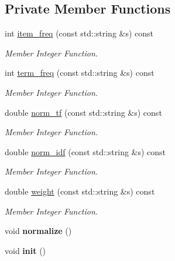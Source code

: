 \subsection*{Private Member Functions}
\begin{DoxyCompactItemize}
\item 
int \hyperlink{class_sentence_af3e48fa5d5776ae122b408191d67d327}{item\+\_\+freq} (const std\+::string \&s) const
\begin{DoxyCompactList}\small\item\em Member Integer Function. \end{DoxyCompactList}\item 
int \hyperlink{class_sentence_aa615a21b45de69ba4a1f0fa257a85ccd}{term\+\_\+freq} (const std\+::string \&s) const
\begin{DoxyCompactList}\small\item\em Member Integer Function. \end{DoxyCompactList}\item 
double \hyperlink{class_sentence_a28fab0061fe288f5ed66bdedf05eb82e}{norm\+\_\+tf} (const std\+::string \&s) const
\begin{DoxyCompactList}\small\item\em Member Integer Function. \end{DoxyCompactList}\item 
double \hyperlink{class_sentence_ac114a37a1f4c317f5141802d2d77b209}{norm\+\_\+idf} (const std\+::string \&s) const
\begin{DoxyCompactList}\small\item\em Member Integer Function. \end{DoxyCompactList}\item 
double \hyperlink{class_sentence_ac7084c1822710975f94ed8a30ac73c2c}{weight} (const std\+::string \&s) const
\begin{DoxyCompactList}\small\item\em Member Integer Function. \end{DoxyCompactList}\item 
\mbox{\label{class_sentence_a69d6f959ca6dfb72a73e8f35f9a12afa}} 
void {\bfseries normalize} ()
\item 
\mbox{\label{class_sentence_ad450504df67b1a466288c1d7d1165813}} 
void {\bfseries init} ()
\end{DoxyCompactItemize}
